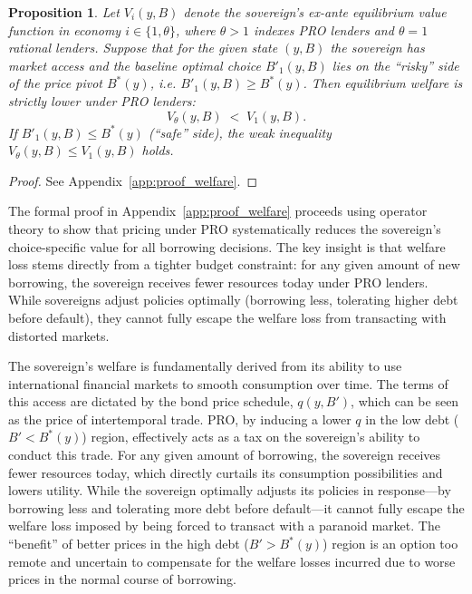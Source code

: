 \documentclass[12pt]{article}
\theoremstyle{plain}
\newtheorem{proposition}{Proposition}
\begin{document}
\begin{proposition}
	\label{prop:welfare}
	Let $V_i(y,B)$ denote the sovereign's ex-ante equilibrium value function in economy $i\in\{1,\theta\}$, where $\theta>1$ indexes PRO lenders and $\theta=1$ rational lenders.
	Suppose that for the given state $(y,B)$ the sovereign has market access and the baseline optimal choice $B'_1(y,B)$ lies on the ``risky'' side of the price pivot $B^*(y)$, i.e. $B'_1(y,B)\ge B^*(y)$.
	Then equilibrium welfare is strictly lower under PRO lenders:
	\[
		V_\theta(y,B) \;<\; V_1(y,B).
	\]
	If $B'_1(y,B) \le B^*(y)$ (``safe'' side), the weak inequality $V_\theta(y,B)
		\le V_1(y,B)$ holds.
\end{proposition}

\begin{proof}
	See Appendix~\ref{app:proof_welfare}.
\end{proof}
The formal proof in Appendix~\ref{app:proof_welfare} proceeds using operator theory to show that pricing under PRO systematically reduces the sovereign's choice-specific value for all borrowing decisions. The key insight is that welfare loss stems directly from a tighter budget constraint: for any given amount of new borrowing, the sovereign receives fewer resources today under PRO lenders. While sovereigns adjust policies optimally (borrowing less, tolerating higher debt before default), they cannot fully escape the welfare loss from transacting with distorted markets.

The sovereign's welfare is fundamentally derived from its ability to use
international financial markets to smooth consumption over time. The terms of
this access are dictated by the bond price schedule, $q(y,B')$, which can be
seen as the price of intertemporal trade. PRO, by inducing a lower $q$ in the
low debt ($B' < B^*(y)$) region, effectively acts as a tax on the sovereign's
ability to conduct this trade. For any given amount of borrowing, the sovereign
receives fewer resources today, which directly curtails its consumption
possibilities and lowers utility. While the sovereign optimally adjusts its
policies in response—by borrowing less and tolerating more debt before
default—it cannot fully escape the welfare loss imposed by being forced to
transact with a paranoid market. The ``benefit'' of better prices in the high
debt ($B' > B^*(y)$) region is an option too remote and uncertain to compensate
for the welfare losses incurred due to worse prices in the normal course of
borrowing.
\end{document}
